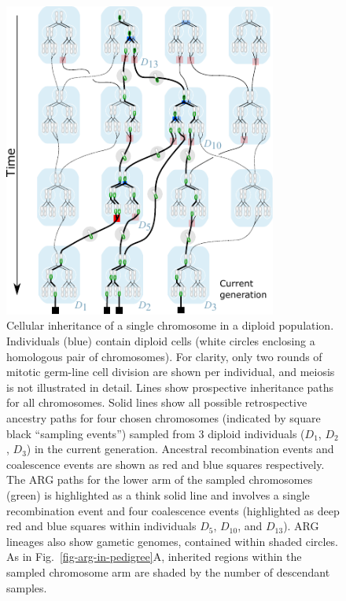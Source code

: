 \documentclass{article}
\begin{document}
\begin{figure}
\begin{center}
    \includegraphics[width=0.8\textwidth]{illustrations/cell-lines}
\end{center}
\caption{\label{fig-cell-lines}
Cellular inheritance of a single chromosome in a diploid population.
Individuals (blue) contain diploid cells (white circles enclosing a homologous pair of chromosomes).
For clarity, only two rounds of mitotic germ-line cell division are shown per individual, and
meiosis is not illustrated in detail.
Lines show prospective inheritance paths for all chromosomes. Solid lines show all possible
retrospective ancestry paths for four chosen chromosomes (indicated by square black ``sampling events'')
sampled from 3 diploid individuals ($D_1$, $D_2$, $D_3$) in the current generation.
Ancestral recombination events and coalescence events are shown as red and blue squares respectively.
The ARG paths for the lower arm of the sampled chromosomes (green) is highlighted as a
think solid line and involves a single recombination event and four coalescence events
(highlighted as deep red and blue squares within individuals $D_5$, $D_{10}$, and $D_{13}$).
ARG lineages also show gametic genomes, contained within shaded circles.
As in Fig.~\ref{fig-arg-in-pedigree}A, inherited regions within the sampled chromosome arm are
shaded by the number of descendant samples.
}
\end{figure}
\end{document}
